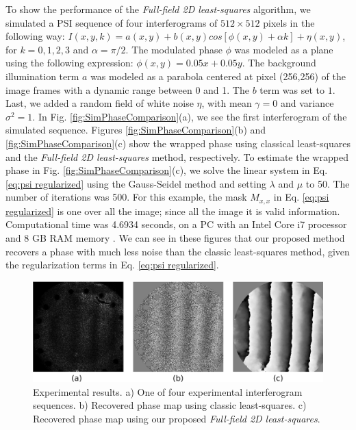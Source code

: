 To show the performance of the \textit{Full-field 2D least-squares} algorithm,
we simulated a PSI sequence of four interferograms of $512 \times 512$ pixels 
in the following way: $I(x,y,k) = a(x,y) + b(x,y) cos[\phi(x,y)+\alpha k] +
\eta(x,y)$, for $k=0,1,2,3$ and $\alpha=\pi/2$. The modulated phase $\phi$ was
modeled as a plane using the following expression: $\phi(x,y)=0.05x+0.05y$. The
background illumination term $a$ was modeled as a parabola centered at pixel
(256,256) of the image frames with a dynamic range between 0 and 1. The $b$ term
was set to $1$. Last, we added a random field of white noise $\eta$, with mean
$\gamma=0$ and variance $\sigma^2=1$. In Fig. \ref{fig:SimPhaseComparison}(a),
we see the first interferogram of the simulated sequence. Figures 
\ref{fig:SimPhaseComparison}(b) and \ref{fig:SimPhaseComparison}(c) show the
wrapped phase using classical least-squares and the
\textit{Full-field 2D least-squares} method, respectively. To estimate the
wrapped phase in Fig. \ref{fig:SimPhaseComparison}(c), we solve the linear
system in Eq. \eqref{eq:psi regularized} using the Gauss-Seidel method and
setting $\lambda$ and $\mu$ to 50. The number of iterations was 500. For
this example, the mask $M_{x,x}$ in Eq. \eqref{eq:psi regularized} is one over
all the image; since all the image it is valid information. Computational
time was 4.6934 seconds, on a PC with an Intel Core i7 processor and 8 GB RAM
memory . We can see in these figures that our proposed method recovers a phase
with much less noise than the classic least-squares method, given the
regularization terms in Eq. \eqref{eq:psi regularized}.
\begin{figure}[th!]
	\begin{center}
		\includegraphics[scale=0.3]{Chpt1_figures/Fig_2.eps}
	\end{center}
	\caption{Experimental results. a) One of four experimental 
	interferogram sequences. b) Recovered phase map using classic 
	least-squares. c) Recovered phase map using our proposed 
	\textit{Full-field 2D least-squares}.}
	\label{fig:ExpPhaseComparison}
\end{figure}
